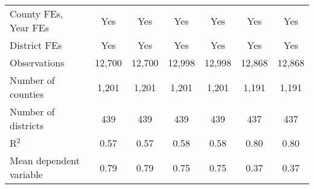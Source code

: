 {\begin{tabular}{l*{6}{c}}
\addlinespace
County FEs, Year FEs &         Yes         &         Yes         &         Yes         &         Yes         &         Yes         &         Yes         \\
\addlinespace
District FEs        &         Yes         &         Yes         &         Yes         &         Yes         &         Yes         &         Yes         \\
\midrule
Observations        &      12,700         &      12,700         &      12,998         &      12,998         &      12,868         &      12,868         \\
Number of counties  &       1,201         &       1,201         &       1,201         &       1,201         &       1,191         &       1,191         \\
Number of districts &         439         &         439         &         439         &         439         &         437         &         437         \\
R$^2$               &        0.57         &        0.57         &        0.58         &        0.58         &        0.80         &        0.80         \\
Mean dependent variable&        0.79         &        0.79         &        0.75         &        0.75         &        0.37         &        0.37         \\
\bottomrule
\end{tabular}
}

